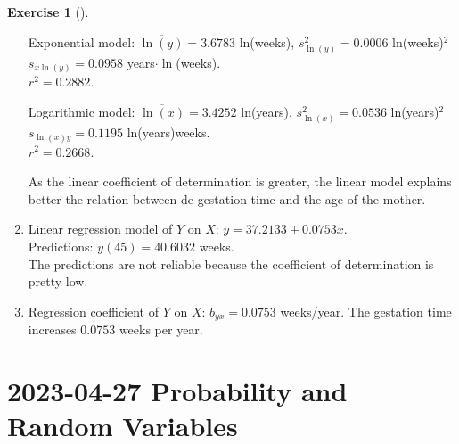 \documentclass[
  a4paper,
]{scrreport}
\theoremstyle{definition}
\newtheorem{exercise}{Exercise}[chapter]
\theoremstyle{remark}
\begin{document}
\begin{exercise}[]
\begin{tcolorbox}
\begin{enumerate}
  Exponential model: \(\overline{\ln(y)} = 3.6783\) ln(weeks),
  \(s_{\ln(y)}^2 = 0.0006\) ln(weeks)\(^2\)\\
  \(s_{x\ln(y)} = 0.0958\) years\(\cdot\ln\)(weeks).\\
  \(r^2 = 0.2882\).

  Logarithmic model: \(\overline{\ln(x)} = 3.4252\) ln(years),
  \(s_{\ln(x)}^2 = 0.0536\) ln(years)\(^2\)\\
  \(s_{\ln(x)y} = 0.1195\) ln(years)weeks.\\
  \(r^2 = 0.2668\).

  As the linear coefficient of determination is greater, the linear
  model explains better the relation between de gestation time and the
  age of the mother.
\item
  Linear regression model of \(Y\) on \(X\):
  \(y = 37.2133 + 0.0753 x\).\\
  Predictions: \(y(45) = 40.6032\) weeks.\\
  The predictions are not reliable because the coefficient of
  determination is pretty low.
\item
  Regression coefficient of \(Y\) on \(X\): \(b_{yx} = 0.0753\)
  weeks/year. The gestation time increases \(0.0753\) weeks per year.
\end{enumerate}

\end{tcolorbox}

\end{exercise}


\hypertarget{probability-and-random-variables-2}{%
\chapter{\texorpdfstring{2023-04-27 Probability and Random
Variables}{2023-04-27  Probability and Random Variables}}\label{probability-and-random-variables-2}}
\end{document}

